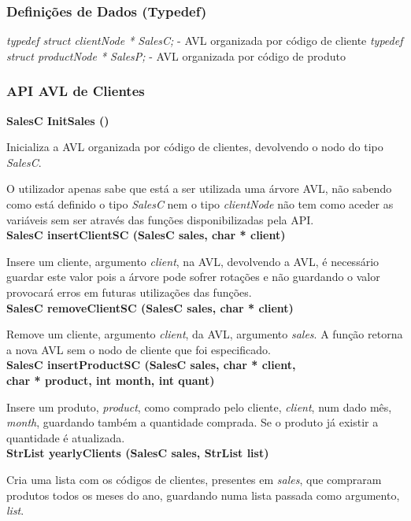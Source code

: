\documentclass[12pt] {article}
\begin{document}
 \subsubsection{Definições de Dados (Typedef)}
 \emph{typedef struct clientNode * SalesC;} - AVL organizada por código de cliente
 \emph{typedef struct productNode * SalesP;} - AVL organizada por código de produto
 
 \subsubsection{API AVL de Clientes}
\noindent \textbf {SalesC InitSales ()}
\par Inicializa a AVL organizada por código de clientes, devolvendo o nodo do tipo \emph{SalesC}.
\par O utilizador apenas sabe que está a ser utilizada uma árvore AVL, não sabendo como está definido o tipo 
\emph{SalesC} nem o tipo \emph{clientNode} não tem como aceder as variáveis sem ser através das funções 
disponibilizadas pela API. \\

\noindent \textbf {SalesC insertClientSC (SalesC sales, char * client)}
\par Insere um cliente, argumento \emph{client}, na AVL, devolvendo a AVL, é necessário guardar este valor
pois a árvore pode sofrer rotações e não guardando o valor provocará erros em futuras utilizações das funções. \\

\noindent \textbf {SalesC removeClientSC (SalesC sales, char * client)}
\par Remove um cliente, argumento \emph{client}, da AVL, argumento \emph{sales}. A função retorna a nova AVL 
sem o nodo de cliente que foi especificado. \\

\noindent \textbf {SalesC insertProductSC (SalesC sales, char * client, \\ char * product, int month, int quant)}
\par Insere um produto, \emph{product}, como comprado pelo cliente, \emph{client}, num dado mês, \emph{month}, 
guardando também a quantidade comprada. Se o produto já existir a quantidade é atualizada. \\

\noindent \textbf {StrList yearlyClients (SalesC sales, StrList list)}
\par Cria uma lista com os códigos de clientes, presentes em \emph{sales}, que compraram produtos todos os 
meses do ano, guardando numa lista passada como argumento, \emph{list}. \\
\end{document}
